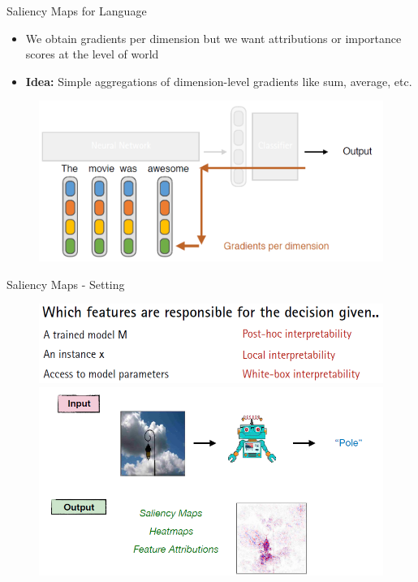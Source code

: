 \documentclass[11pt,compress,t,notes=noshow, aspectratio=169, xcolor=table]{beamer}
\begin{document}
\begin{frame}{Saliency Maps for Language}
    \begin{itemize}
        \item We obtain gradients per dimension but we want attributions or importance scores at
the level of world
        \item \textbf{Idea:} Simple aggregations of dimension-level gradients like sum, average, etc.
    \end{itemize}
    \begin{figure}
        \centering
        \includegraphics[scale=.4]{bild18}
    \end{figure}
\end{frame}

\begin{frame}{Saliency Maps - Setting}
    \begin{figure}
        \centering
        \includegraphics[width=0.6\linewidth]{bild19}
        \pause
        \includegraphics[width=0.6\linewidth]{bild20}
    \end{figure}
\end{frame}
\end{document}
